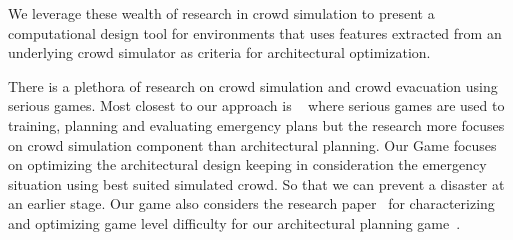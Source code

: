 
We leverage these wealth of research in crowd simulation to present a computational design tool for environments that uses features extracted from an underlying crowd simulator as criteria for architectural optimization.

There is a plethora of research on crowd simulation and crowd evacuation using serious games. Most closest to our approach is  ~\cite{ribeiro2013towards} where serious games are used to training, planning and evaluating emergency plans but the research more focuses on crowd simulation component than architectural planning. Our Game focuses on optimizing the architectural design keeping in consideration the emergency situation using best suited simulated crowd. So that we can prevent a disaster at an earlier stage. Our game also considers the  research paper~\cite{berseth2014characterizing} for characterizing and optimizing game level difficulty for our architectural planning game~.
